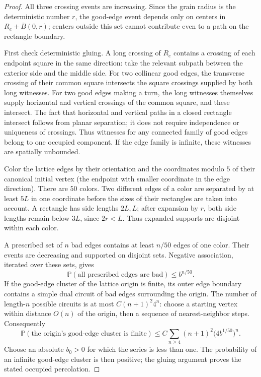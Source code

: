 \documentclass[11pt,a4paper]{article}
\theoremstyle{definition}
\theoremstyle{remark}
\numberwithin{equation}{section}
\begin{document}
\begin{proof}
All three crossing events are increasing.  Since the grain radius
is the deterministic number $r$, the good-edge event depends only
on centers in $R_e+\overline B(0,r)$; centers outside this set
cannot contribute even to a path on the rectangle boundary.

First check deterministic gluing.  A long crossing of $R_e$
contains a crossing of each endpoint square in the same direction:
take the relevant subpath between the exterior side and the middle
side.  For two collinear good edges, the transverse crossing of
their common square intersects the square crossings supplied by
both long witnesses.  For two good edges making a turn, the long
witnesses themselves supply horizontal and vertical crossings of
the common square, and these intersect.  The fact that horizontal
and vertical paths in a closed rectangle intersect follows from
planar separation; it does not require independence or uniqueness
of crossings.  Thus witnesses for any connected family of good
edges belong to one occupied component.  If the edge family is
infinite, these witnesses are spatially unbounded.

Color the lattice edges by their orientation and the coordinates
modulo $5$ of their canonical initial vertex (the endpoint with
smaller coordinate in the edge direction).  There are $50$
colors.  Two different edges of a color are separated by at least
$5L$ in one coordinate before the sizes of their rectangles are
taken into account.  A rectangle has side lengths $2L,L$; after
expansion by $r$, both side lengths remain below $3L$, since
$2r<L$.  Thus expanded supports are disjoint within each color.

A prescribed set of $n$ bad edges contains at least $n/50$
edges of one color.  Their events are decreasing and supported
on disjoint sets.  Negative association, iterated over these
sets, gives
\begin{equation}\label{ell:bad-edge-product}
 \mathbb P(\text{all prescribed edges are bad})\le b^{n/50}.
\end{equation}
If the good-edge cluster of the lattice origin is finite, its
outer edge boundary contains a simple dual circuit of bad edges
surrounding the origin.  The number of length-$n$ possible circuits
is at most $C(n+1)^2 4^n$: choose a starting vertex within distance
$O(n)$ of the origin, then a sequence of nearest-neighbor steps.
Consequently
\begin{equation}\label{ell:peierls}
 \mathbb P(\text{the origin's good-edge cluster is finite})
 \le C\sum_{n\ge4}(n+1)^2\bigl(4b^{1/50}\bigr)^n.
\end{equation}
Choose an absolute $b_0>0$ for which the series is less than one.
The probability of an infinite good-edge cluster is then positive;
the gluing argument proves the stated occupied percolation.
\end{proof}
\end{document}

